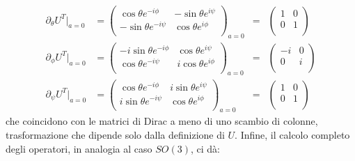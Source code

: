 \documentclass[fleqn,italian]{article}
\theoremstyle{definition}
\theoremstyle{remark}
\theoremstyle{plain}%
\theoremstyle{definition}
\theoremstyle{remark}
\numberwithin{equation}{section}
\numberwithin{thm}{section}
\begin{document}
\begin{equation}
\begin{split}
\partial_\theta U^T|_{a=0} & =
        \begin{pmatrix} \cos\theta e^{-i\phi} & -\sin\theta e^{i\psi} \\
                  -\sin\theta e^{-i\psi} & \cos\theta e^{i\phi} \\
        \end{pmatrix}_{a=0} & = &
        \begin{pmatrix} 1 & 0 \\ 0 & 1 \\ \end{pmatrix} \\
\partial_\phi U^T|_{a=0} & =
        \begin{pmatrix} -i\sin\theta e^{-i\phi} & \cos\theta e^{i\psi} \\
                  \cos\theta e^{-i\psi} & i\cos\theta e^{i\phi} \\
        \end{pmatrix}_{a=0} & = &
        \begin{pmatrix} -i & 0 \\ 0 & i \\ \end{pmatrix} \\
\partial_\psi U^T|_{a=0} & =
        \begin{pmatrix} \cos\theta e^{-i\phi} & i\sin\theta e^{i\psi} \\
                  i\sin\theta e^{-i\psi} & \cos\theta e^{i\phi} \\
        \end{pmatrix}_{a=0} & = &
        \begin{pmatrix} 1 & 0 \\ 0 & 1 \\ \end{pmatrix}
\end{split}
\end{equation}
che coincidono con le matrici di Dirac a meno di uno scambio di colonne,
trasformazione che dipende solo dalla definizione di $U$.
Infine, il calcolo completo degli operatori, in analogia al caso $SO(3)$,
ci d\`a:
\end{document}
